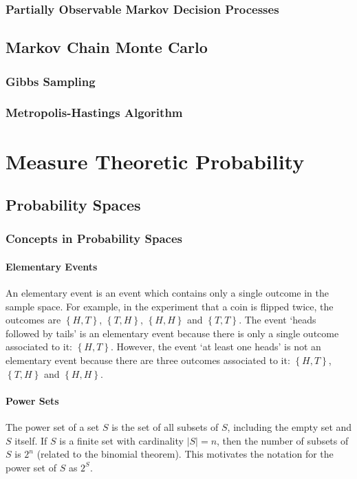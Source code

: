 \documentclass[11pt]{report} %
\begin{document}
\subsection{Partially Observable Markov Decision Processes}

\section{Markov Chain Monte Carlo}

\subsection{Gibbs Sampling}

\subsection{Metropolis-Hastings Algorithm}

\chapter{Measure Theoretic Probability}

\section{Probability Spaces}

\subsection{Concepts in Probability Spaces}

\subsubsection{Elementary Events}
An elementary event is an event which contains only a single outcome in the sample space. For example, in the experiment that a coin is flipped twice, the outcomes are $\left\{H, T\right\}$, $\left\{T, H\right\}$, $\left\{H, H\right\}$ and $\left\{T, T\right\}$. The event `heads followed by tails' is an elementary event because there is only a single outcome associated to it: $\left\{H, T\right\}$. However, the event `at least one heads' is not an elementary event because there are three outcomes associated to it: $\left\{H, T\right\}$, $\left\{T, H\right\}$ and $\left\{H, H\right\}$.

\subsubsection{Power Sets}
The power set of a set $S$ is the set of all subsets of $S$, including the empty set and $S$ itself. If $S$ is a finite set with cardinality $\left|S\right| = n$, then the number of subsets of $S$ is $2^{n}$ (related to the binomial theorem). This motivates the notation for the power set of $S$ as $2^{S}$. \\
\end{document}
